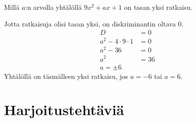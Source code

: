 \begin{esimerkki}
Millä $a$:n arvolla yhtälöllä $9x^2+ax+1$ on tasan yksi ratkaisu.

Jotta ratkaisuja olisi tasan yksi, on diskriminantin oltava 0.
\begin{align*}
D &=0\\
a^2-4\cdot 9\cdot 1 &= 0\\
a^2-36&=0\\
a^2&=36\\
a=\pm6
\end{align*}
Yhtälöllä on täsmälleen yksi ratkaisu, jos $a=-6$ tai $a=6$.
\end{esimerkki}



\section{Harjoitustehtäviä}
